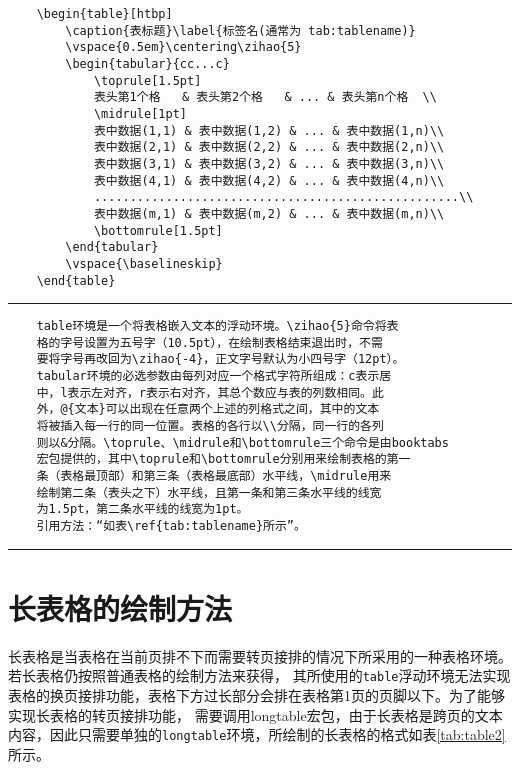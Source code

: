 \begin{verbatim}
	\begin{table}[htbp]
		\caption{表标题}\label{标签名(通常为 tab:tablename)}
		\vspace{0.5em}\centering\zihao{5}
		\begin{tabular}{cc...c}
			\toprule[1.5pt]
			表头第1个格   & 表头第2个格   & ... & 表头第n个格  \\
			\midrule[1pt]
			表中数据(1,1) & 表中数据(1,2) & ... & 表中数据(1,n)\\
			表中数据(2,1) & 表中数据(2,2) & ... & 表中数据(2,n)\\
			表中数据(3,1) & 表中数据(3,2) & ... & 表中数据(3,n)\\
			表中数据(4,1) & 表中数据(4,2) & ... & 表中数据(4,n)\\
			...................................................\\
			表中数据(m,1) & 表中数据(m,2) & ... & 表中数据(m,n)\\
			\bottomrule[1.5pt]
		\end{tabular}
		\vspace{\baselineskip}
	\end{table}
\end{verbatim}

\noindent\hrule

\begin{verbatim}
	table环境是一个将表格嵌入文本的浮动环境。\zihao{5}命令将表
	格的字号设置为五号字（10.5pt），在绘制表格结束退出时，不需
	要将字号再改回为\zihao{-4}，正文字号默认为小四号字（12pt）。
	tabular环境的必选参数由每列对应一个格式字符所组成：c表示居
	中，l表示左对齐，r表示右对齐，其总个数应与表的列数相同。此
	外，@{文本}可以出现在任意两个上述的列格式之间，其中的文本
	将被插入每一行的同一位置。表格的各行以\\分隔，同一行的各列
	则以&分隔。\toprule、\midrule和\bottomrule三个命令是由booktabs
	宏包提供的，其中\toprule和\bottomrule分别用来绘制表格的第一
	条（表格最顶部）和第三条（表格最底部）水平线，\midrule用来
	绘制第二条（表头之下）水平线，且第一条和第三条水平线的线宽
	为1.5pt，第二条水平线的线宽为1pt。
	引用方法：“如表\ref{tab:tablename}所示”。
\end{verbatim}

\noindent\hrule
\section{长表格的绘制方法}
长表格是当表格在当前页排不下而需要转页接排的情况下所采用的一种表格环境。若长表格仍按照普通表格的绘制方法来获得，
其所使用的\verb|table|浮动环境无法实现表格的换页接排功能，表格下方过长部分会排在表格第1页的页脚以下。为了能够实现长表格的转页接排功能，
需要调用longtable宏包，由于长表格是跨页的文本内容，因此只需要单独的\verb|longtable|环境，所绘制的长表格的格式如表\ref{tab:table2}所示。

